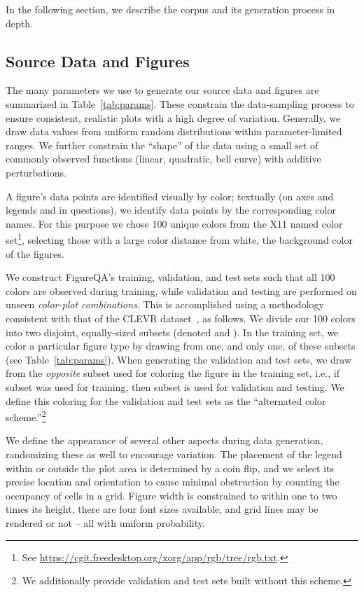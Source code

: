\documentclass{article} \usepackage{iclr2018_workshop,times}
\begin{document}
In the following section, we describe the corpus and its generation process in depth.

\subsection{Source Data and Figures}
\label{sec:source_data_and_figures}
The many parameters we use to generate our source data and figures are summarized in Table~\ref{tab:params}.
These constrain the data-sampling process to ensure consistent, realistic plots with a high degree of variation.
Generally, we draw data values from uniform random distributions within parameter-limited ranges.
We further constrain the ``shape'' of the data using a small set of commonly observed functions (linear, quadratic, bell curve) with additive perturbations.

A figure's data points are identified visually by color; textually (on axes and legends and in questions), we identify data points by the corresponding color names.
For this purpose we chose 100 unique colors from the X11 named color set\footnote{See \url{https://cgit.freedesktop.org/xorg/app/rgb/tree/rgb.txt}.}, selecting those with a large color distance from white, the background color of the figures.

We construct FigureQA's training, validation, and test sets such that all 100 colors are observed during training, while validation and testing are performed on unseen \emph{color-plot combinations}.
This is accomplished using a methodology consistent with that of the CLEVR dataset~\citep{johnson2016clevr}, as follows.
We divide our 100 colors into two disjoint, equally-sized subsets (denoted  and ). In the training set, we color a particular figure type by drawing from one, and only one, of these subsets (see Table~\ref{tab:params}).
When generating the validation and test sets, we draw from the \emph{opposite} subset used for coloring the figure in the training set, i.e., if subset  was used for training, then subset  is used for validation and testing.
We define this coloring for the validation and test sets as the  ``alternated color scheme.''\footnote{We additionally provide validation and test sets built without this scheme.}

We define the appearance of several other aspects during data generation, randomizing these as well to encourage variation.
The placement of the legend within or outside the plot area is determined by a coin flip, and we select its precise location and orientation to cause minimal obstruction by counting the occupancy of cells in a  grid.
Figure width is constrained to within one to two times its height, there are four font sizes available, and grid lines may be rendered or not -- all with uniform probability.
\end{document}
